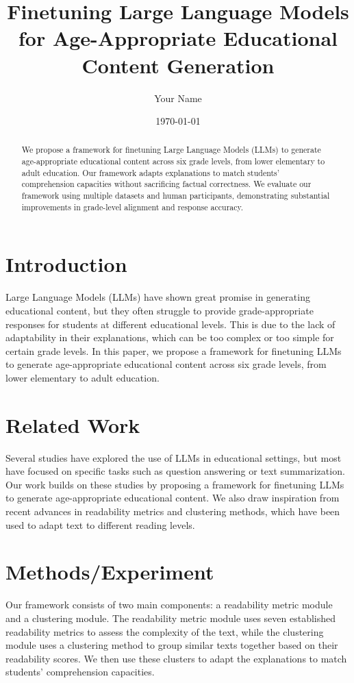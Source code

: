 \documentclass{article}
\begin{document}
\title{Finetuning Large Language Models for Age-Appropriate Educational Content Generation}
\author{Your Name}
\date{\today}

\maketitle

\begin{abstract}
We propose a framework for finetuning Large Language Models (LLMs) to generate age-appropriate educational content across six grade levels, from lower elementary to adult education. Our framework adapts explanations to match students' comprehension capacities without sacrificing factual correctness. We evaluate our framework using multiple datasets and human participants, demonstrating substantial improvements in grade-level alignment and response accuracy.
\end{abstract}

\section{Introduction}
Large Language Models (LLMs) have shown great promise in generating educational content, but they often struggle to provide grade-appropriate responses for students at different educational levels. This is due to the lack of adaptability in their explanations, which can be too complex or too simple for certain grade levels. In this paper, we propose a framework for finetuning LLMs to generate age-appropriate educational content across six grade levels, from lower elementary to adult education.

\section{Related Work}
Several studies have explored the use of LLMs in educational settings, but most have focused on specific tasks such as question answering or text summarization. Our work builds on these studies by proposing a framework for finetuning LLMs to generate age-appropriate educational content. We also draw inspiration from recent advances in readability metrics and clustering methods, which have been used to adapt text to different reading levels.

\section{Methods/Experiment}
Our framework consists of two main components: a readability metric module and a clustering module. The readability metric module uses seven established readability metrics to assess the complexity of the text, while the clustering module uses a clustering method to group similar texts together based on their readability scores. We then use these clusters to adapt the explanations to match students' comprehension capacities.
\end{document}
